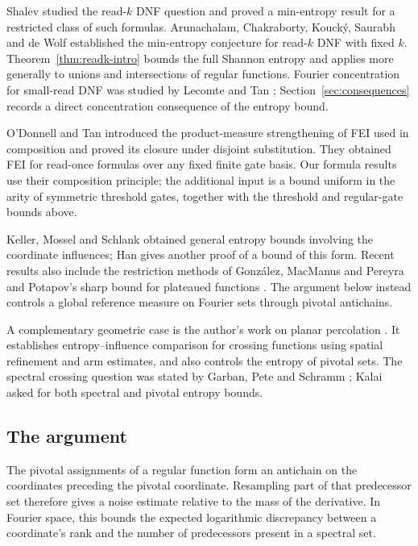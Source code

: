 \documentclass[11pt]{amsart}
\theoremstyle{definition}
\theoremstyle{remark}
\begin{document}
Shalev \cite{Shalev18} studied the read-$k$ DNF question and proved a min-entropy result for a restricted class of such formulas. Arunachalam, Chakraborty, Kouck\'y, Saurabh and de Wolf \cite{ACKSW21} established the min-entropy conjecture for read-$k$ DNF with fixed $k$. Theorem~\ref{thm:readk-intro} bounds the full Shannon entropy and applies more generally to unions and intersections of regular functions. Fourier concentration for small-read DNF was studied by Lecomte and Tan \cite{LT21}; Section~\ref{sec:consequences} records a direct concentration consequence of the entropy bound.

O'Donnell and Tan \cite{ODT13} introduced the product-measure strengthening of FEI used in composition and proved its closure under disjoint substitution. They obtained FEI for read-once formulas over any fixed finite gate basis. Our formula results use their composition principle; the additional input is a bound uniform in the arity of symmetric threshold gates, together with the threshold and regular-gate bounds above.

Keller, Mossel and Schlank \cite{KMS12} obtained general entropy bounds involving the coordinate influences; Han \cite{Han25} gives another proof of a bound of this form. Recent results also include the restriction methods of Gonz\'alez, MacManus and Pereyra \cite{GMP26} and Potapov's sharp bound for plateaued functions \cite{Potapov26}. The argument below instead controls a global reference measure on Fourier sets through pivotal antichains.

A complementary geometric case is the author's work on planar percolation \cite{Shmalo26}. It establishes entropy--influence comparison for crossing functions using spatial refinement and arm estimates, and also controls the entropy of pivotal sets. The spectral crossing question was stated by Garban, Pete and Schramm \cite[Section~11]{GPS10}; Kalai \cite[Conjecture~8]{Kalai18} asked for both spectral and pivotal entropy bounds.

\subsection{The argument}

The pivotal assignments of a regular function form an antichain on the coordinates preceding the pivotal coordinate. Resampling part of that predecessor set therefore gives a noise estimate relative to the mass of the derivative. In Fourier space, this bounds the expected logarithmic discrepancy between a coordinate's rank and the number of predecessors present in a spectral set.
\end{document}

